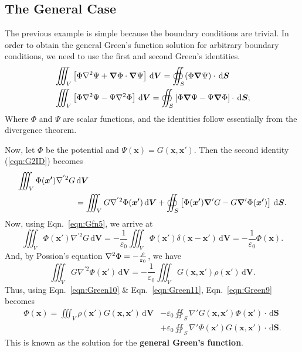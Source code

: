 \documentclass[12pt,english]{article}
\newcommand{\dmr}[1]{\, \mathrm{d}#1} %
\renewcommand{\vec}[1]{\boldsymbol{#1}}
\begin{document}
\subsection{The General Case}
The previous example is simple because the boundary conditions are trivial. In order to obtain the general Green's function solution for arbitrary boundary conditions, we need to use the first and second Green's identities.
\begin{subequations}
    \begin{align}
         & \iiint_{V}\left[\Phi\laplacian\Psi + \grad\Phi \cdot \grad\Psi\right] \dmr{\vec{V}} = \oiint_S (\Phi\grad\Psi)\cdot\dmr{\vec{S}} \label{eqn:G1ID}                          \\
         & \iiint_{V}\left[\Phi\laplacian\Psi - \Psi\laplacian\Phi\right] \dmr{\vec{V}} = \oiint_S \left[ \Phi\grad\Psi - \Psi\grad\Phi \right] \cdot \dmr{\vec{S}}; \label{eqn:G2ID}
    \end{align}
\end{subequations}
Where $\Phi$ and $\Psi$ are scalar functions, and the identities follow essentially from the divergence theorem.

Now, let $\Phi$ be the potential and $\Psi(\vec{x}) = G(\vec{x}, \vec{x'})$. Then the second identity (\ref{eqn:G2ID}) becomes
\begin{equation}
    \begin{split}
        \iiint_{V} \Phi(\vec{x'}) \nabla^{'2} G &\dmr{\vec{V}} \\
        &= \iiint_{V} G \nabla^{'2} \Phi(\vec{x'}) \dmr{\vec{V}} + \oiint_S \left[ \Phi(\vec{x'}) \grad' G - G\grad'\Phi(\vec{x'})  \right] \dmr{\vec{S}}. \label{eqn:Green9}
    \end{split}
\end{equation}
Now, using Eqn.~\ref{eqn:Gfn5}, we arrive at
\begin{equation}
    \iiint_{V} \Phi(\vec{x'}) \nabla^{'2} G \dmr{\vec{V}} = -\frac{1}{\varepsilon_0}\iiint_V \Phi(\vec{x'})\delta(\vec{x}-\vec{x'})\dmr{\vec{V}} = -\frac{1}{\varepsilon_0}\Phi(\vec{x}). \label{eqn:Green10}
\end{equation}
And, by Possion's equation $\laplacian\Phi = - \frac{\rho}{\varepsilon_0}$, we have
\begin{equation}
    \iiint_{V} G \nabla^{'2} \Phi(\vec{x'}) \dmr{\vec{V}} = -\frac{1}{\varepsilon_0}\iiint_V G(\vec{x},\vec{x'})\rho(\vec{x'})\dmr{\vec{V}}. \label{eqn:Green11}
\end{equation}
Thus, using Eqn.~\ref{eqn:Green10} \& Eqn.~\ref{eqn:Green11}, Eqn.~\ref{eqn:Green9} becomes
\begin{equation}
    \begin{split}
        \Phi(\vec{x}) = \iiint_V \rho(\vec{x'})G(\vec{x}, \vec{x'}) \dmr{\vec{V}} &- \varepsilon_0 \oiint_S\nabla'G(\vec{x}, \vec{x'})\Phi(\vec{x'})\cdot\dmr{\vec{S}}\\
        &+ \varepsilon_0\oiint_S\nabla'\Phi(\vec{x'})G(\vec{x}, \vec{x'})\cdot\dmr{\vec{S}}.
    \end{split}
\end{equation}
This is known as the solution for the \textbf{general Green's function}.
\end{document}

